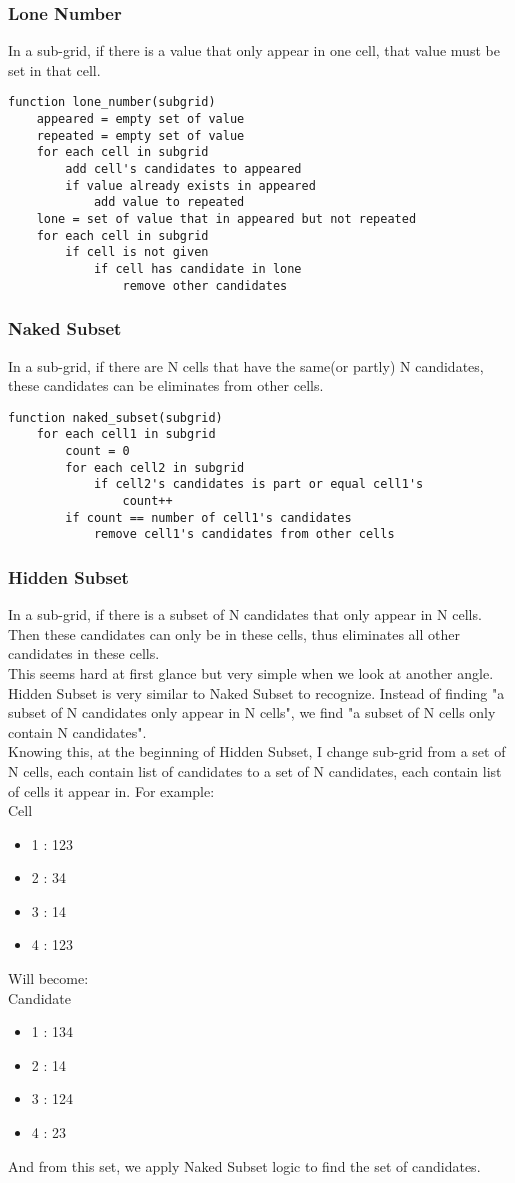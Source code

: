 \documentclass{article}
\begin{document}
\subsubsection{Lone Number}
In a sub-grid, if there is a value that only appear in one cell, that value must be set in that cell.
\begin{lstlisting}
function lone_number(subgrid)
    appeared = empty set of value
    repeated = empty set of value
    for each cell in subgrid
        add cell's candidates to appeared
        if value already exists in appeared
            add value to repeated
    lone = set of value that in appeared but not repeated
    for each cell in subgrid
        if cell is not given
            if cell has candidate in lone
                remove other candidates
\end{lstlisting}
\subsubsection{Naked Subset}
In a sub-grid, if there are N cells that have the same(or partly) N candidates, these candidates can be eliminates from other cells.
\begin{lstlisting}
function naked_subset(subgrid)
    for each cell1 in subgrid
        count = 0
        for each cell2 in subgrid
            if cell2's candidates is part or equal cell1's
                count++
        if count == number of cell1's candidates
            remove cell1's candidates from other cells
\end{lstlisting}
\subsubsection{Hidden Subset}
In a sub-grid, if there is a subset of N candidates that only appear in N cells. Then these candidates can only be in these cells, thus eliminates all other candidates in these cells.
\\
This seems hard at first glance but very simple when we look at another angle. Hidden Subset is very similar to Naked Subset to recognize. Instead of finding "a subset of N candidates only appear in N cells", we find "a subset of N cells only contain N candidates".
\\
Knowing this, at the beginning of Hidden Subset, I change sub-grid from a set of N cells, each contain list of candidates to a set of N candidates, each contain list of cells it appear in. For example: \\
Cell
\begin{itemize}
    \item 1 : 123
    \item 2 : 34
    \item 3 : 14
    \item 4 : 123
\end{itemize}
Will become: \\
Candidate
\begin{itemize}
    \item 1 : 134
    \item 2 : 14
    \item 3 : 124
    \item 4 : 23
\end{itemize}
And from this set, we apply Naked Subset logic to find the set of candidates.
\end{document}
